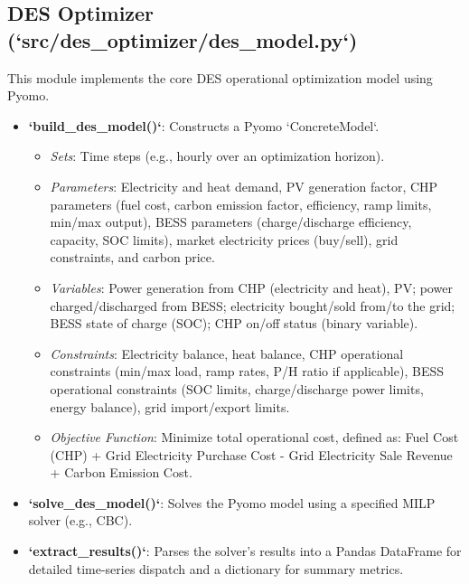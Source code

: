 \subsection{DES Optimizer (`src/des_optimizer/des_model.py`)}
This module implements the core DES operational optimization model using Pyomo.
\begin{itemize}
    \item \textbf{`build_des_model()`}: Constructs a Pyomo `ConcreteModel`. 
    \begin{itemize}
        \item \textit{Sets}: Time steps (e.g., hourly over an optimization horizon).
        \item \textit{Parameters}: Electricity and heat demand, PV generation factor, CHP parameters (fuel cost, carbon emission factor, efficiency, ramp limits, min/max output), BESS parameters (charge/discharge efficiency, capacity, SOC limits), market electricity prices (buy/sell), grid constraints, and carbon price.
        \item \textit{Variables}: Power generation from CHP (electricity and heat), PV; power charged/discharged from BESS; electricity bought/sold from/to the grid; BESS state of charge (SOC); CHP on/off status (binary variable).
        \item \textit{Constraints}: Electricity balance, heat balance, CHP operational constraints (min/max load, ramp rates, P/H ratio if applicable), BESS operational constraints (SOC limits, charge/discharge power limits, energy balance), grid import/export limits.
        \item \textit{Objective Function}: Minimize total operational cost, defined as: Fuel Cost (CHP) + Grid Electricity Purchase Cost - Grid Electricity Sale Revenue + Carbon Emission Cost.
    \end{itemize}
    \item \textbf{`solve_des_model()`}: Solves the Pyomo model using a specified MILP solver (e.g., CBC).
    \item \textbf{`extract_results()`}: Parses the solver's results into a Pandas DataFrame for detailed time-series dispatch and a dictionary for summary metrics.
\end{itemize}

